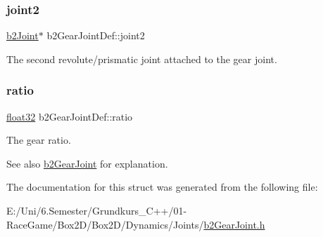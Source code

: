 \subsubsection{\texorpdfstring{joint2}{joint2}}
{\footnotesize\ttfamily \mbox{\hyperlink{classb2_joint}{b2\+Joint}}$\ast$ b2\+Gear\+Joint\+Def\+::joint2}



The second revolute/prismatic joint attached to the gear joint. 

\mbox{\label{structb2_gear_joint_def_a57e9f4b6ce1ddc8b89b8455515f69323}} 
\subsubsection{\texorpdfstring{ratio}{ratio}}
{\footnotesize\ttfamily \mbox{\hyperlink{b2_settings_8h_aacdc525d6f7bddb3ae95d5c311bd06a1}{float32}} b2\+Gear\+Joint\+Def\+::ratio}

The gear ratio. \begin{DoxySeeAlso}{See also}
\mbox{\hyperlink{classb2_gear_joint}{b2\+Gear\+Joint}} for explanation. 
\end{DoxySeeAlso}


The documentation for this struct was generated from the following file\+:\begin{DoxyCompactItemize}
\item 
E\+:/\+Uni/6.\+Semester/\+Grundkurs\+\_\+\+C++/01-\/\+Race\+Game/\+Box2\+D/\+Box2\+D/\+Dynamics/\+Joints/\mbox{\hyperlink{b2_gear_joint_8h}{b2\+Gear\+Joint.\+h}}\end{DoxyCompactItemize}
